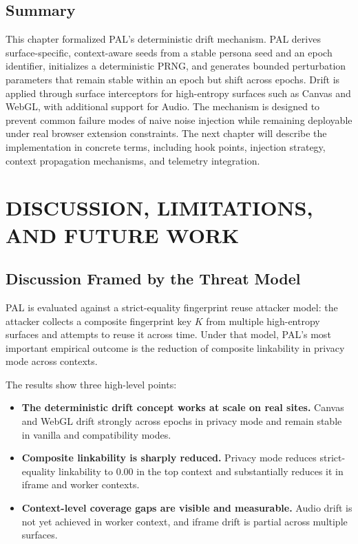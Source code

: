 \documentclass[11pt]{report}
\begin{document}
\section{Summary}

This chapter formalized PAL’s deterministic drift mechanism. PAL derives surface-specific, context-aware seeds from a stable persona seed and an epoch identifier, initializes a deterministic PRNG, and generates bounded perturbation parameters that remain stable within an epoch but shift across epochs. Drift is applied through surface interceptors for high-entropy surfaces such as Canvas and WebGL, with additional support for Audio. The mechanism is designed to prevent common failure modes of naive noise injection while remaining deployable under real browser extension constraints. The next chapter will describe the implementation in concrete terms, including hook points, injection strategy, context propagation mechanisms, and telemetry integration.








\chapter{DISCUSSION, LIMITATIONS, AND FUTURE WORK}

\section{Discussion Framed by the Threat Model}

PAL is evaluated against a strict-equality fingerprint reuse attacker model: the attacker collects a composite fingerprint key $K$ from multiple high-entropy surfaces and attempts to reuse it across time. Under that model, PAL’s most important empirical outcome is the reduction of composite linkability in privacy mode across contexts.

The results show three high-level points:

\begin{itemize}
    \item \textbf{The deterministic drift concept works at scale on real sites.} Canvas and WebGL drift strongly across epochs in privacy mode and remain stable in vanilla and compatibility modes.
    \item \textbf{Composite linkability is sharply reduced.} Privacy mode reduces strict-equality linkability to $0.00$ in the top context and substantially reduces it in iframe and worker contexts.
    \item \textbf{Context-level coverage gaps are visible and measurable.} Audio drift is not yet achieved in worker context, and iframe drift is partial across multiple surfaces.
\end{itemize}
\end{document}
